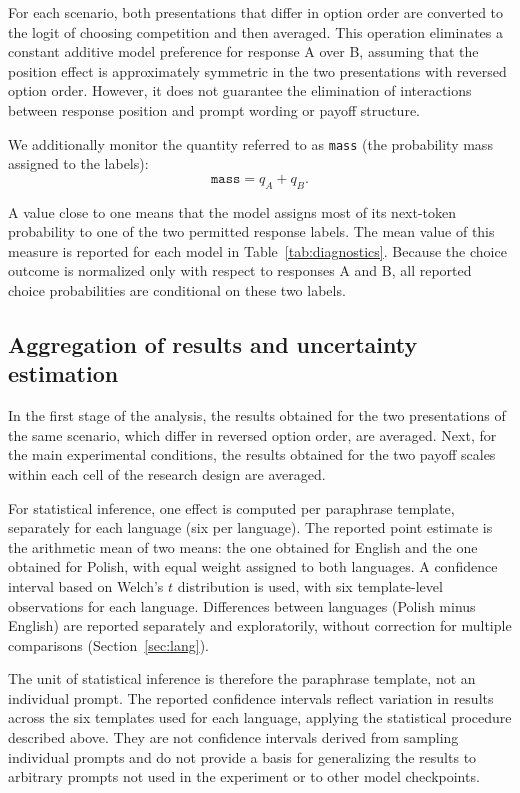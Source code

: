 \documentclass[11pt]{article}
\begin{document}
For each scenario, both presentations that differ in option order are converted to the logit of choosing competition and then averaged. This operation eliminates a constant additive model preference for response A over B, assuming that the position effect is approximately symmetric in the two presentations with reversed option order. However, it does not guarantee the elimination of interactions between response position and prompt wording or payoff structure.

We additionally monitor the quantity referred to as \texttt{mass} (the probability mass assigned to the labels):
\begin{equation}
    \texttt{mass}=q_A+q_B.
\end{equation}

A value close to one means that the model assigns most of its next-token probability to one of the two permitted response labels. The mean value of this measure is reported for each model in Table~\ref{tab:diagnostics}. Because the choice outcome is normalized only with respect to responses A and B, all reported choice probabilities are conditional on these two labels.

\subsection{Aggregation of results and uncertainty estimation}\label{sec:stats}
In the first stage of the analysis, the results obtained for the two presentations of the same scenario, which differ in reversed option order, are averaged. Next, for the main experimental conditions, the results obtained for the two payoff scales within each cell of the research design are averaged.

For statistical inference, one effect is computed per paraphrase template, separately for each language (six per language). The reported point estimate is the arithmetic mean of two means: the one obtained for English and the one obtained for Polish, with equal weight assigned to both languages. A confidence interval based on Welch's $t$ distribution is used, with six template-level observations for each language. Differences between languages (Polish minus English) are reported separately and exploratorily, without correction for multiple comparisons (Section~\ref{sec:lang}).

The unit of statistical inference is therefore the paraphrase template, not an individual prompt. The reported confidence intervals reflect variation in results across the six templates used for each language, applying the statistical procedure described above. They are not confidence intervals derived from sampling individual prompts and do not provide a basis for generalizing the results to arbitrary prompts not used in the experiment or to other model checkpoints.
\end{document}
